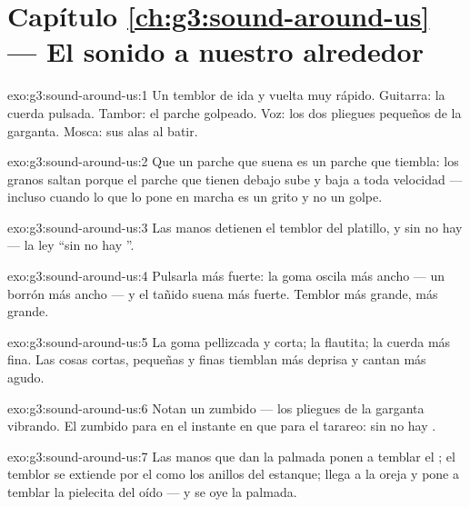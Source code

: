 \section*{Capítulo \ref{ch:g3:sound-around-us} --- El sonido a nuestro alrededor}

\begin{solution}{exo:g3:sound-around-us:1}
Un temblor de ida y vuelta muy rápido. Guitarra: la cuerda pulsada.
Tambor: el parche golpeado. Voz: los dos pliegues pequeños de la
garganta. Mosca: sus alas al batir.
\end{solution}

\begin{solution}{exo:g3:sound-around-us:2}
Que un parche que suena es un parche que tiembla: los granos saltan
porque el parche que tienen debajo sube y baja a toda velocidad ---
incluso cuando lo que lo pone en marcha es un grito y no un golpe.
\end{solution}

\begin{solution}{exo:g3:sound-around-us:3}
Las manos detienen el temblor del platillo, y sin  no hay
 --- la ley ``sin  no hay ''.
\end{solution}

\begin{solution}{exo:g3:sound-around-us:4}
Pulsarla más fuerte: la goma oscila más ancho --- un borrón más ancho
--- y el tañido suena más fuerte. Temblor más grande,  más
grande.
\end{solution}

\begin{solution}{exo:g3:sound-around-us:5}
La goma pellizcada y corta; la flautita; la cuerda más fina. Las cosas
cortas, pequeñas y finas tiemblan más deprisa y cantan más agudo.
\end{solution}

\begin{solution}{exo:g3:sound-around-us:6}
Notan un zumbido --- los pliegues de la garganta vibrando. El zumbido
para en el instante en que para el tarareo: sin  no hay
.
\end{solution}

\begin{solution}{exo:g3:sound-around-us:7}
Las manos que dan la palmada ponen a temblar el ; el temblor se
extiende por el  como los anillos del estanque; llega a la oreja y
pone a temblar la pielecita del oído --- y se oye la palmada.
\end{solution}

